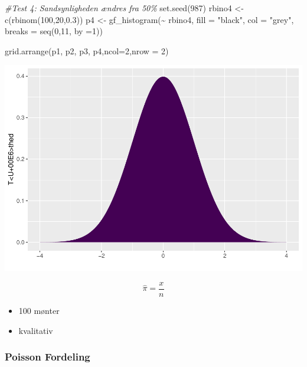 \documentclass[
]{article}
\newenvironment{Shaded}{\begin{snugshade}}{\end{snugshade}}
\newcommand{\AttributeTok}[1]{\textcolor[rgb]{0.77,0.63,0.00}{#1}}
\newcommand{\CommentTok}[1]{\textcolor[rgb]{0.56,0.35,0.01}{\textit{#1}}}
\newcommand{\DecValTok}[1]{\textcolor[rgb]{0.00,0.00,0.81}{#1}}
\newcommand{\FloatTok}[1]{\textcolor[rgb]{0.00,0.00,0.81}{#1}}
\newcommand{\FunctionTok}[1]{\textcolor[rgb]{0.00,0.00,0.00}{#1}}
\newcommand{\NormalTok}[1]{#1}
\newcommand{\OtherTok}[1]{\textcolor[rgb]{0.56,0.35,0.01}{#1}}
\newcommand{\SpecialCharTok}[1]{\textcolor[rgb]{0.00,0.00,0.00}{#1}}
\newcommand{\StringTok}[1]{\textcolor[rgb]{0.31,0.60,0.02}{#1}}
\providecommand{\tightlist}{%
  \setlength{\itemsep}{0pt}\setlength{\parskip}{0pt}}
\begin{document}
\begin{Shaded}
\begin{Highlighting}[]
\CommentTok{\#Test 4: Sandsynligheden ændres fra 50\%}
\FunctionTok{set.seed}\NormalTok{(}\DecValTok{987}\NormalTok{)}
\NormalTok{rbino4 }\OtherTok{\textless{}{-}} \FunctionTok{c}\NormalTok{(}\FunctionTok{rbinom}\NormalTok{(}\DecValTok{100}\NormalTok{,}\DecValTok{20}\NormalTok{,}\FloatTok{0.3}\NormalTok{))}
\NormalTok{p4 }\OtherTok{\textless{}{-}} \FunctionTok{gf\_histogram}\NormalTok{(}\SpecialCharTok{\textasciitilde{}}\NormalTok{ rbino4, }\AttributeTok{fill =} \StringTok{"black"}\NormalTok{, }\AttributeTok{col =} \StringTok{"grey"}\NormalTok{, }\AttributeTok{breaks =} \FunctionTok{seq}\NormalTok{(}\DecValTok{0}\NormalTok{,}\DecValTok{11}\NormalTok{, }\AttributeTok{by =}\DecValTok{1}\NormalTok{)) }

\FunctionTok{grid.arrange}\NormalTok{(p1, p2, p3, p4,}\AttributeTok{ncol=}\DecValTok{2}\NormalTok{,}\AttributeTok{nrow =} \DecValTok{2}\NormalTok{)}
\end{Highlighting}
\end{Shaded}

\includegraphics{TP2_files/figure-latex/unnamed-chunk-9-1.pdf}

\[ \hat\pi = \frac{x}n\]

\begin{itemize}
\tightlist
\item
  100 mønter
\item
  kvalitativ
\end{itemize}

\hypertarget{poisson-fordeling}{%
\subsubsection{Poisson Fordeling}\label{poisson-fordeling}}
\end{document}
